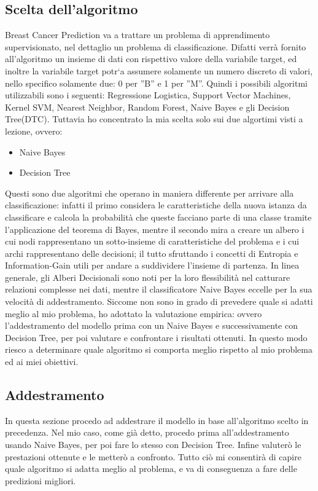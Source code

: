 \documentclass{article}
\begin{document}
\subsection{Scelta dell'algoritmo}
Breast Cancer Prediction va a trattare un problema di apprendimento supervisionato, nel dettaglio un problema di classificazione. Difatti verrà fornito all’algoritmo un insieme di dati con rispettivo valore della variabile target, ed inoltre la variabile target potr`a assumere solamente un numero discreto di valori, nello specifico solamente due: 0 per ”B” e 1 per ”M”. Quindi i possibili algoritmi utilizzabili sono i seguenti: Regressione Logistica, Support Vector Machines, Kernel SVM, Nearest Neighbor, Random Forest, Naive Bayes e gli Decision Tree(DTC).
Tuttavia ho concentrato la mia scelta solo sui due algortimi visti a lezione, ovvero:
\begin{itemize}
    \item Naive Bayes
    \item Decision Tree
\end{itemize}
Questi sono due algoritmi che operano in maniera differente per arrivare alla classificazione: infatti il primo considera le caratteristiche della nuova istanza da classificare e calcola la probabilità che queste facciano parte di una classe tramite l’applicazione del teorema di Bayes, mentre il secondo mira a creare un albero i cui nodi rappresentano un sotto-insieme di caratteristiche del problema e i cui archi rappresentano delle decisioni; il tutto sfruttando i concetti di Entropia e Information-Gain utili per andare a suddividere l’insieme di partenza.
In linea generale, gli Alberi Decisionali sono noti per la loro flessibilità nel catturare relazioni complesse nei dati, mentre il classificatore Naive Bayes eccelle per la sua velocità di addestramento. Siccome non sono in grado di prevedere quale si adatti meglio al mio problema, ho adottato la valutazione empirica: ovvero l’addestramento del modello prima con un Naive Bayes e successivamente con Decision Tree, per poi valutare e confrontare i risultati ottenuti.
In questo modo riesco a determinare quale algoritmo si comporta meglio rispetto al mio problema ed ai miei obiettivi.

\subsection{Addestramento}
In questa sezione procedo ad addestrare il modello in base all’algoritmo scelto in precedenza. Nel mio caso, come già detto, procedo prima all’addestramento usando Naive Bayes, per poi fare lo stesso con Decision Tree. Infine valuterò le prestazioni ottenute e le metterò a confronto. Tutto ciò mi consentirà di capire quale algoritmo si adatta meglio al problema, e va di conseguenza a fare delle predizioni
migliori.
\end{document}
